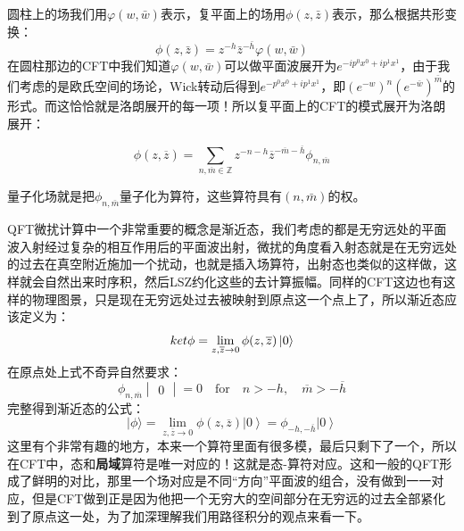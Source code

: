 圆柱上的场我们用$\varphi(w,\bar w)$表示，复平面上的场用$\phi(z,\bar z)$表示，那么根据共形变换：
\begin{equation}
	\phi(z,\bar z)=z^{-h}{\bar {z}}^{-\bar h}\varphi(w,\bar w)
\end{equation}
在圆柱那边的CFT中我们知道$\varphi(w,\bar w)$可以做平面波展开为$e^{-ip^0x^0+ip^1x^1}$，由于我们考虑的是欧氏空间的场论，Wick转动后得到$e^{-p^0x^0+ip^1x^1}$，即$(e^{-w})^n(e^{-\bar w})^{\bar m}$的形式。而这恰恰就是洛朗展开的每一项！所以复平面上的CFT的模式展开为洛朗展开：
\begin{theorem}
	\begin{equation}
		\boxed{\phi(z,\overline{z})=\sum_{n,\overline{m}\in\mathbb{Z}}z^{-n-h}\overline{z}^{-\overline{m}-\overline{h}}\phi_{n,\overline{m}}}
	\end{equation}
\end{theorem}
量子化场就是把$\phi_{n,\bar m}$量子化为算符，这些算符具有$(n,\bar m)$的权。

QFT微扰计算中一个非常重要的概念是渐近态，我们考虑的都是无穷远处的平面波入射经过复杂的相互作用后的平面波出射，微扰的角度看入射态就是在无穷远处的过去在真空附近施加一个扰动，也就是插入场算符，出射态也类似的这样做，这样就会自然出来时序积，然后LSZ约化这些的去计算振幅。同样的CFT这边也有这样的物理图景，只是现在无穷远处过去被映射到原点这一个点上了，所以渐近态应该定义为：
\begin{equation}
	ket{\phi}=\lim_{z,\overline{z}\to0}\phi(z,\overline{z})\ket{0}
\end{equation}
在原点处上式不奇异自然要求：
\begin{equation}
	\phi_{n,\overline{m}}\begin{vmatrix}0\end{vmatrix}=0\quad\text{for}\quad n>-h,\quad\overline{m}>-\overline{h}
\end{equation}
完整得到渐近态的公式：
\begin{equation}
	\boxed{|\phi\rangle=\lim\limits_{z,\overline{z}\to0}\phi(z,\overline{z})\left|0\right\rangle=\phi_{-h,-\overline{h}}\left|0\right\rangle}
\end{equation}
这里有个非常有趣的地方，本来一个算符里面有很多模，最后只剩下了一个，所以在CFT中，态和\textbf{局域}算符是唯一对应的！这就是态\mbox{-}算符对应。这和一般的QFT形成了鲜明的对比，那里一个场对应是不同“方向”平面波的组合，没有做到一一对应，但是CFT做到正是因为他把一个无穷大的空间部分在无穷远的过去全部紧化到了原点这一处，为了加深理解我们用路径积分的观点来看一下。


